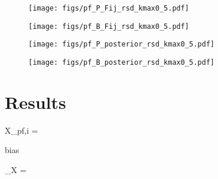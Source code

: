 \begin{figure}
\begin{center}
    \texttt{[image: figs/pf\_P\_Fij\_rsd\_kmax0\_5.pdf]} 
    \caption{}
\label{fig:pfij_rsd}
\end{center}
\end{figure}

\begin{figure}
\begin{center}
    \texttt{[image: figs/pf\_B\_Fij\_rsd\_kmax0\_5.pdf]} 
    \caption{}
\label{fig:bfij_rsd}
\end{center}
\end{figure}

\begin{figure}
\begin{center}
    \texttt{[image: figs/pf\_P\_posterior\_rsd\_kmax0\_5.pdf]}
    \caption{}
\label{fig:ppost_rsd}
\end{center}
\end{figure}

\begin{figure}
\begin{center}
    \texttt{[image: figs/pf\_B\_posterior\_rsd\_kmax0\_5.pdf]}
    \caption{}
\label{fig:bpost_rsd}
\end{center}
\end{figure}

\section{Results} \label{sec:results} 
\beq
X_{{\rm pf},i} =  \big[ X_{{\rm pf},i}^{(1)} + X_{{\rm pf},i}^{(2)}\big]
\eeq

bias

\beq
\beta_X = 
\eeq
